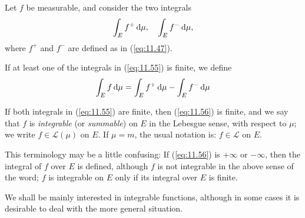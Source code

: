 \begin{mydef}
    \label{mydef:11.22}
    Let $f$ be measurable, and consider the two integrals
    \begin{equation}
        \label{eq:11.55}
        \int_E f^+ \d \mu , \quad 
        \int_E f^- \d \mu ,
    \end{equation}
    where $f^+$ and $f^-$ are defined as in (\ref{eq:11.47}).

    If at least one of the integrals in (\ref{eq:11.55}) is finite, 
    we define 
    \begin{equation}
        \label{eq:11.56}
        \int_E f \d \mu = 
        \int_E f^+ \d \mu -
        \int_E f^- \d \mu 
    \end{equation}
    
    If both integrals in (\ref{eq:11.55}) are finite, then (\ref{eq:11.56}) is finite,
    and we say that $f$ is \emph{integrable} (or \emph{summable}) on $E$ in the Lebesgue sense, with respect to $\mu$;
    we write $f \in \mathscr{L}(\mu)$ on $E$.
    If $\mu = m$, the usual notation is: 
    $f \in \mathscr{L}$ on $E$.

    This terminology may be a little confusing:
    If (\ref{eq:11.56}) is $+\infty$ or $-\infty$,
    then the integral of $f$ over $E$ is defined, 
    although $f$ is not integrable in the above sense of the word;
    $f$ is integrable on $E$ only if its integral over $E$ is finite.

    We shall be mainly interested in integrable functions,
    although in some cases it is desirable to deal with the more general situation.
\end{mydef}

